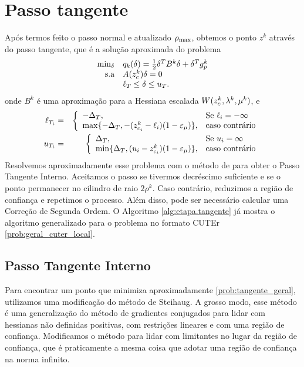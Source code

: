 \section{Passo tangente}

Após termos feito o passo normal e atualizado $\rho_{\max}$,
obtemos o ponto $z^k$ através do passo tangente,
que é a solução aproximada do problema
\begin{equation}\visiblelbl{prob:tangente_geral}
 \begin{array}{rl}
  \min_{\delta} & q_k(\delta) = \meio\delta^T B^k\delta + \delta^Tg_p^k \\
\mbox{s.a} & A(\zc{k})\delta = 0 \\
           & \ell_T \leq \delta \leq u_T.
 \end{array}
\end{equation}
onde $B^k$ é uma aproximação para a Hessiana escalada $W(z_c^{k}, \lambda^{k}, \mu^{k})$, e
\begin{eqnarray*}
  \ell_{T_i} & = &
\left\{
\begin{array}{ll}
-\Delta_T, & \mbox{Se } \ell_i = -\infty \\
\max\{-\Delta_T, -(z_{c_i}^k - \ell_i)(1 - \varepsilon_{\mu})\}, & \mbox{caso contrário}
\end{array}
\right. \\
  u_{T_i} & = &
\left\{
\begin{array}{ll}
\Delta_T, & \mbox{Se } u_i = \infty \\
\min\{\Delta_T, (u_i - z_{c_i}^k)(1 - \varepsilon_{\mu})\}, & \mbox{caso contrário}
\end{array}
\right.
\end{eqnarray*}
Resolvemos aproximadamente esse problema com o método de \citet{bib:steihaug}
para obter o Passo Tangente Interno.  Aceitamos o passo se tivermos decréscimo
suficiente e se o ponto permanecer no cilindro de raio $2\rho^k$. Caso
contrário, reduzimos a região de confiança e repetimos o processo. Além disso,
pode ser necessário calcular uma Correção de Segunda Ordem. 
O Algoritmo \ref{alg:etapa.tangente} já mostra o algoritmo generalizado para o
problema no formato CUTEr \eqref{prob:geral_cuter_local}.

\subsection{Passo Tangente Interno}

Para encontrar um ponto que minimiza aproximadamente \eqref{prob:tangente_geral}, utilizamos
uma modificação do método de Steihaug. A grosso modo, esse método é uma generalização do
método de gradientes conjugados para lidar com hessianas não definidas positivas, com
restrições lineares e com uma região de confiança. Modificamos o método para lidar
com limitantes no lugar da região de confiança, que é praticamente a mesma coisa
que adotar uma região de confiança na norma infinito.

